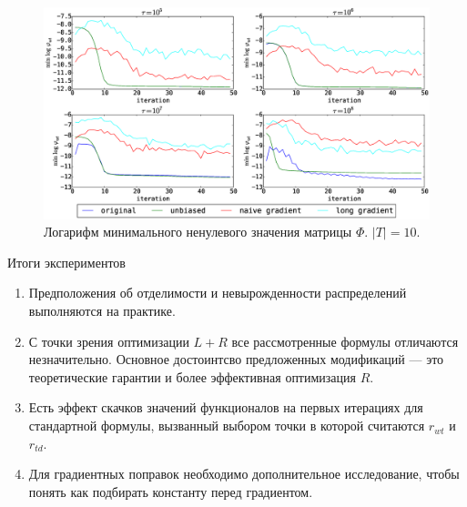 \documentclass[utf8]{beamer}
\begin{document}
\begin{frame}
\begin{figure}[h]
	\centering
	\caption{Логарифм минимального ненулевого значения матрицы $\Phi$. $|T| = 10$.}    
	\includegraphics[width=1.0\linewidth]{presentation_pictures/topics_10_minPhi_values}
\end{figure}
\end{frame}
	
	
\begin{frame}{Итоги экспериментов}
\begin{enumerate}
\item Предположения об отделимости и невырожденности распределений выполняются на практике.
\item С точки зрения оптимизации $L +  R$ все рассмотренные формулы отличаются незначительно. Основное достоинтсво предложенных модификаций --- это теоретические гарантии и более эффективная оптимизация $R$.
\item Есть эффект скачков значений функционалов на первых итерациях для стандартной формулы, вызванный выбором точки в которой считаются $r_{wt}$ и $r_{td}$.
\item Для градиентных поправок необходимо дополнительное исследование, чтобы понять как подбирать константу перед градиентом.
\end{enumerate}
\end{frame}
\end{document}
